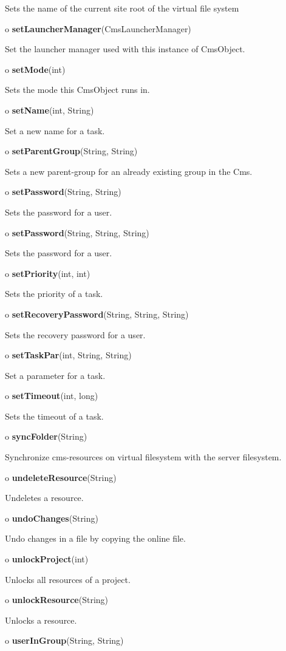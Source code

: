 \begin{description}
Sets the name of the current site root of the virtual file system  
\item o {\bf setLauncherManager}(CmsLauncherManager)  

Set the launcher manager used with this instance of CmsObject.  
\item o {\bf setMode}(int)  

Sets the mode this CmsObject runs in.  
\item o {\bf setName}(int, String)  

Set a new name for a task.  
\item o {\bf setParentGroup}(String, String)  

Sets a new parent-group for an already existing group in the Cms.  
\item o {\bf setPassword}(String, String)  

Sets the password for a user.  
\item o {\bf setPassword}(String, String, String)  

Sets the password for a user.  
\item o {\bf setPriority}(int, int)  

Sets the priority of a task.  
\item o {\bf setRecoveryPassword}(String, String, String)  

Sets the recovery password for a user.  
\item o {\bf setTaskPar}(int, String, String)  

Set a parameter for a task.  
\item o {\bf setTimeout}(int, long)  

Sets the timeout of a task.  
\item o {\bf syncFolder}(String)  

Synchronize cms-resources on virtual filesystem with the server filesystem.  
\item o {\bf undeleteResource}(String)  

Undeletes a resource.  
\item o {\bf undoChanges}(String)  

Undo changes in a file by copying the online file.  
\item o {\bf unlockProject}(int)  

Unlocks all resources of a project.  
\item o {\bf unlockResource}(String)  

Unlocks a resource.  
\item o {\bf userInGroup}(String, String)  


\end{description}
